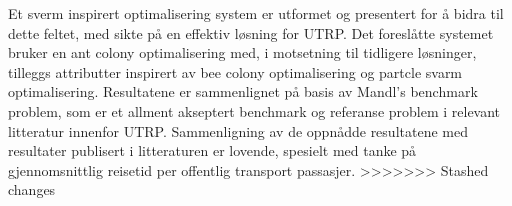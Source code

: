 Et sverm inspirert optimalisering system er utformet og presentert for å bidra til dette feltet, med sikte på en effektiv løsning for UTRP. Det foreslåtte systemet bruker en ant colony optimalisering med, i motsetning til tidligere løsninger, tilleggs attributter inspirert av bee colony optimalisering og partcle svarm optimalisering. Resultatene er sammenlignet på basis av Mandl's benchmark problem, som er et allment akseptert benchmark og referanse problem i relevant litteratur innenfor UTRP. Sammenligning av de oppnådde resultatene med resultater publisert i litteraturen er lovende, spesielt med tanke på gjennomsnittlig reisetid per offentlig transport passasjer.
>>>>>>> Stashed changes
